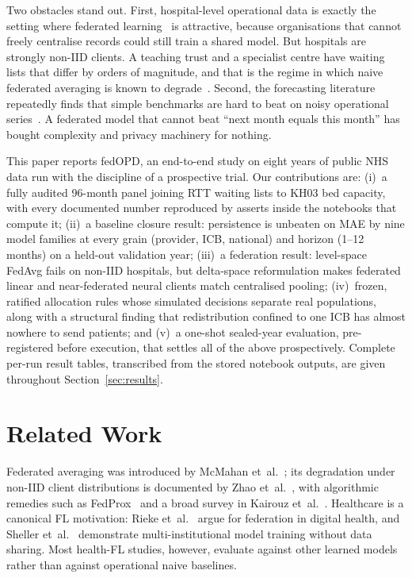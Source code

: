 \documentclass[conference]{IEEEtran}
\begin{document}
Two obstacles stand out. First, hospital-level operational data is exactly the setting where
federated learning~\cite{mcmahan2017} is attractive, because organisations that cannot freely
centralise records could still train a shared model. But hospitals are strongly non-IID clients. A
teaching trust and a specialist centre have waiting lists that differ by orders of magnitude, and
that is the regime in which naive federated averaging is known to degrade~\cite{zhao2018,li2020}.
Second, the forecasting literature repeatedly finds that simple benchmarks are hard to beat on
noisy operational series~\cite{makridakis2020,hyndman2021}. A federated model that cannot beat
``next month equals this month'' has bought complexity and privacy machinery for nothing.

This paper reports fedOPD, an end-to-end study on eight years of public NHS data run with the
discipline of a prospective trial. Our contributions are:
(i)~a fully audited 96-month panel joining RTT waiting lists to KH03 bed capacity, with every
documented number reproduced by asserts inside the notebooks that compute it;
(ii)~a baseline closure result: persistence is unbeaten on MAE by nine model families at every
grain (provider, ICB, national) and horizon (1--12 months) on a held-out validation year;
(iii)~a federation result: level-space FedAvg fails on non-IID hospitals, but delta-space
reformulation makes federated linear and near-federated neural clients match centralised pooling;
(iv)~frozen, ratified allocation rules whose simulated decisions separate real populations, along
with a structural finding that redistribution confined to one ICB has almost nowhere to send
patients; and (v)~a one-shot sealed-year evaluation, pre-registered before execution, that settles
all of the above prospectively. Complete per-run result tables, transcribed from the stored
notebook outputs, are given throughout Section~\ref{sec:results}.

\section{Related Work}
Federated averaging was introduced by McMahan et~al.~\cite{mcmahan2017}; its degradation under
non-IID client distributions is documented by Zhao et~al.~\cite{zhao2018}, with algorithmic
remedies such as FedProx~\cite{li2020} and a broad survey in Kairouz et~al.~\cite{kairouz2021}.
Healthcare is a canonical FL motivation: Rieke et~al.~\cite{rieke2020} argue for federation in
digital health, and Sheller et~al.~\cite{sheller2020} demonstrate multi-institutional model
training without data sharing. Most health-FL studies, however, evaluate against other learned
models rather than against operational naive baselines.
\end{document}
